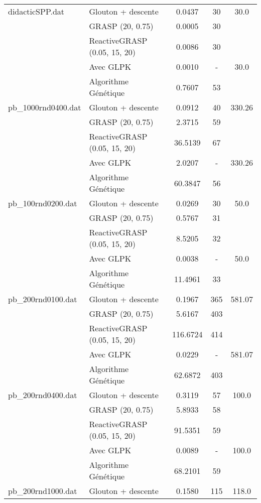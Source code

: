 \begin{minipage}
\begin{longtable}{|l|l|c|c|c|}
didacticSPP.dat & Glouton + descente & 0.0437 & 30 & 30.0 \\
                & GRASP (20, 0.75) & 0.0005 & 30 & \\
                & ReactiveGRASP (0.05, 15, 20) & 0.0086 & 30 & \\
                & Avec GLPK & 0.0010 & - & 30.0 \\
                & Algorithme Génétique & 0.7607 & 53 & \\
\hline
pb\_1000rnd0400.dat & Glouton + descente & 0.0912 & 40 & 330.26 \\
                    & GRASP (20, 0.75) & 2.3715 & 59 & \\
                    & ReactiveGRASP (0.05, 15, 20) & 36.5139 & 67 & \\
                    & Avec GLPK & 2.0207 & - & 330.26 \\
                    & Algorithme Génétique & 60.3847 & 56 & \\
\hline
pb\_100rnd0200.dat & Glouton + descente & 0.0269 & 30 & 50.0 \\
                   & GRASP (20, 0.75) & 0.5767 & 31 & \\
                   & ReactiveGRASP (0.05, 15, 20) & 8.5205 & 32 & \\
                   & Avec GLPK & 0.0038 & - & 50.0 \\
                   & Algorithme Génétique & 11.4961 & 33 & \\
\hline
pb\_200rnd0100.dat & Glouton + descente & 0.1967 & 365 & 581.07 \\
                   & GRASP (20, 0.75) & 5.6167 & 403 & \\
                   & ReactiveGRASP (0.05, 15, 20) & 116.6724 & 414 & \\
                   & Avec GLPK & 0.0229 & - & 581.07 \\
                   & Algorithme Génétique & 62.6872 & 403 & \\
\hline
pb\_200rnd0400.dat & Glouton + descente & 0.3119 & 57 & 100.0 \\
                   & GRASP (20, 0.75) & 5.8933 & 58 & \\
                   & ReactiveGRASP (0.05, 15, 20) & 91.5351 & 59 & \\
                   & Avec GLPK & 0.0089 & - & 100.0 \\
                   & Algorithme Génétique & 68.2101 & 59 & \\
\hline
pb\_200rnd1000.dat & Glouton + descente & 0.1580 & 115 & 118.0 \\

\end{longtable}
\end{minipage}
